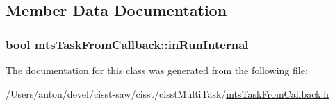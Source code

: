 \subsection{Member Data Documentation}
\hypertarget{classmts_task_from_callback_ab39ba4bafd286ab8fffbbee89de845f6}{}
\subsubsection[{in\+Run\+Internal}]{\setlength{\rightskip}{0pt plus 5cm}bool mts\+Task\+From\+Callback\+::in\+Run\+Internal\hspace{0.3cm}{\ttfamily [protected]}}\label{classmts_task_from_callback_ab39ba4bafd286ab8fffbbee89de845f6}


The documentation for this class was generated from the following file\+:\begin{DoxyCompactItemize}
\item 
/\+Users/anton/devel/cisst-\/saw/cisst/cisst\+Multi\+Task/\hyperlink{mts_task_from_callback_8h}{mts\+Task\+From\+Callback.\+h}\end{DoxyCompactItemize}
